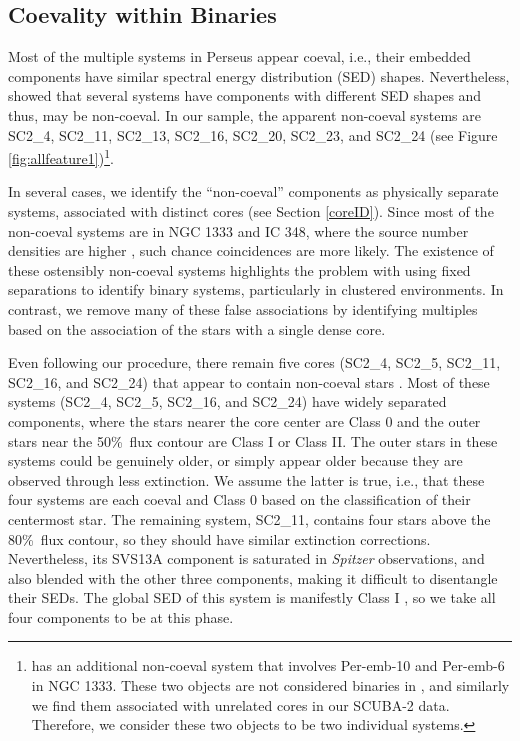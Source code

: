\documentclass[usenatbib,a4paper]{mnras}
\begin{document}
\subsection{Coevality within Binaries}\label{noncoeval}

Most of the multiple systems in Perseus appear coeval, i.e., their embedded components have similar spectral energy distribution (SED) shapes.  Nevertheless, \citet{Murillo16} showed that several systems have components with different SED shapes and thus, may be non-coeval.  In our sample, the apparent non-coeval systems are SC2\_4, SC2\_11, SC2\_13, SC2\_16, SC2\_20, SC2\_23, and SC2\_24 (see Figure \ref{fig:allfeature1})\footnote{\citet{Murillo16} has an additional non-coeval system that involves Per-emb-10 and Per-emb-6 in NGC 1333.  These two objects are not considered binaries in \citet{Tobin16}, and similarly we find them associated with unrelated cores in our SCUBA-2 data.  Therefore, we consider these two objects to be two individual systems.}.


In several cases, we identify the ``non-coeval'' components as physically separate systems, associated with distinct cores (see Section \ref{coreID}).   Since most of the non-coeval systems are in NGC 1333 and IC 348, where the source number densities are higher \citep{Bally08, Gutermuth09}, such chance coincidences are more likely. The existence of these ostensibly non-coeval systems highlights the problem with using fixed separations to identify binary systems, particularly in clustered environments.  In contrast, we remove many of these false associations by identifying multiples based on the association of the stars with a single dense core.  

Even following our procedure, there remain five cores (SC2\_4, SC2\_5, SC2\_11, SC2\_16, and SC2\_24) that appear to contain non-coeval stars \citep[see Table \ref{coreBinary},][]{Murillo16}.  Most of these systems (SC2\_4, SC2\_5, SC2\_16, and SC2\_24) have widely separated components, where the stars nearer the core center are Class 0 and the outer stars near the 50\%\ flux contour are Class I or Class II.  The outer stars in these systems could be genuinely older, or simply appear older because they are observed through less extinction.  We assume the latter is true, i.e., that these four systems are each coeval and Class 0 based on the classification of their centermost star.    The remaining system, SC2\_11, contains four stars above the 80\%\ flux contour, so they should have similar extinction corrections.   Nevertheless, its SVS13A component is saturated in \emph{Spitzer} observations, and also blended with the other three components, making it difficult to disentangle their SEDs.   The global SED of this system is manifestly Class I \citep{Evans09,Sadavoy14}, so we take all four components to be at this phase.  
\end{document}
